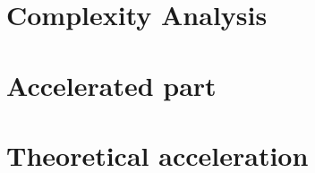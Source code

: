 \documentclass[11pt]{article}
\begin{document}
\section{Complexity Analysis}

\section{Accelerated part}

\section{Theoretical acceleration}




\end{document}
